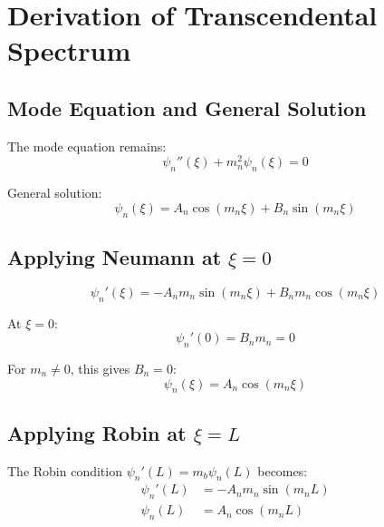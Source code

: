 \documentclass[11pt,a4paper]{article}
\newcommand{\mb}{m_b}
\theoremstyle{definition}
\theoremstyle{plain}
\theoremstyle{remark}
\begin{document}
\section{Derivation of Transcendental Spectrum}
\label{sec:transcendental}

\subsection{Mode Equation and General Solution}

The mode equation remains:
\begin{equation}
\psi_n''(\xi) + m_n^2\psi_n(\xi) = 0
\label{eq:mode-eq-2}
\end{equation}

General solution:
\begin{equation}
\psi_n(\xi) = A_n\cos(m_n\xi) + B_n\sin(m_n\xi)
\label{eq:gen-soln-2}
\end{equation}

\subsection{Applying Neumann at $\xi = 0$}

\begin{equation}
\psi_n'(\xi) = -A_n m_n\sin(m_n\xi) + B_n m_n\cos(m_n\xi)
\label{eq:derivative}
\end{equation}

At $\xi = 0$:
\begin{equation}
\psi_n'(0) = B_n m_n = 0
\label{eq:bc-at-0}
\end{equation}

For $m_n \neq 0$, this gives $B_n = 0$:
\begin{equation}
\psi_n(\xi) = A_n\cos(m_n\xi)
\label{eq:cosine-only}
\end{equation}

\subsection{Applying Robin at $\xi = L$}

The Robin condition $\psi_n'(L) = \mb\psi_n(L)$ becomes:
\begin{align}
\psi_n'(L) &= -A_n m_n\sin(m_n L) \label{eq:psi-prime-L} \\
\psi_n(L) &= A_n\cos(m_n L) \label{eq:psi-L}
\end{align}
\end{document}
